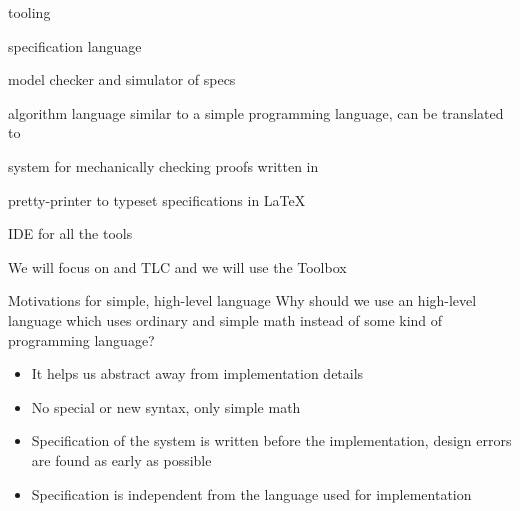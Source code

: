 \begin{frame}{\tlap tooling}
    \begin{description}
        \item<1->[\tlap] specification language
        \item<1->[TLC] model checker and simulator of \tlap specs
        \item<-1>[PlusCal] algorithm language similar to a simple programming language, can be translated to \tlap
        \item<-1>[TLAPS] system for mechanically checking proofs written in \tlap
        \item<-1>[TLATeX] pretty-printer to typeset \tlap specifications in \LaTeX
        \item<1->[Toolbox] IDE for all the \tlap tools
    \end{description}
    \pause
    \vspace{0.5cm}
    \begin{center}
        We will focus on \tlap and TLC and we will use the \tlap Toolbox
    \end{center}
\end{frame}


\begin{frame}{Motivations for simple, high-level language}
    Why should we use an high-level language which uses ordinary and simple math instead of some kind of programming language?
    \begin{itemize}[<+->]
        \item It helps us abstract away from implementation details
        \item No special or new syntax, only simple math
        \item Specification of the system is written before the implementation, design errors are found as early as possible
        \item Specification is independent from the language used for implementation
    \end{itemize}
\end{frame}

